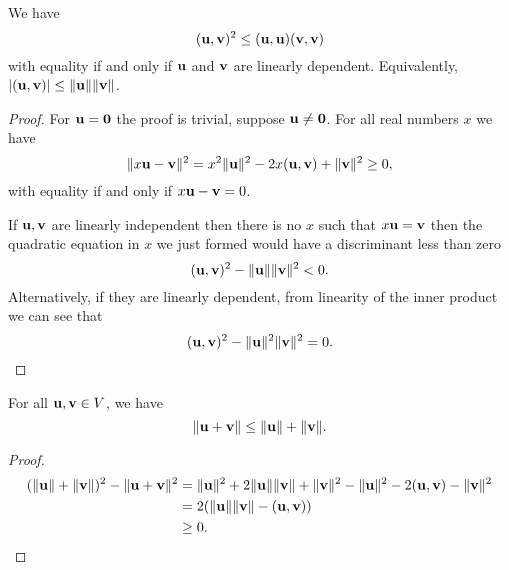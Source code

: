 \documentclass[10pt, a4paper]{article}
\begin{document}
\begin{theorem}\label{pre:linalg:thm:cauchyschwarz}
    We have
    \[
    (\mathbf{u}, \mathbf{v}) ^ 2 \leq (\mathbf{u}, \mathbf{u})(\mathbf{v}, \mathbf{v})
    \]
    with equality if and only if $\mathbf{u}$ and $\mathbf{v}$ are linearly dependent.
    Equivalently,
    $|(\mathbf{u}, \mathbf{v})| \leq \|\mathbf{u}\|\|\mathbf{v}\|$.

    \begin{proof}
        For $\mathbf{u} = \mathbf{0}$ the proof is trivial,
        suppose $\mathbf{u} \neq \mathbf{0}$.
        For all real numbers $x$ we have
        \[
        \|x\mathbf{u} - \mathbf{v}\| ^ 2 = x ^ 2\|\mathbf{u}\| ^ 2 - 2x(\mathbf{u}, \mathbf{v}) + \|\mathbf{v}\| ^ 2 \geq 0,
        \]
        with equality if and only if $x\mathbf{u} - \mathbf{v} = 0$.

        If $\mathbf{u}, \mathbf{v}$ are linearly independent then there is no $x$ such that $x\mathbf{u} = \mathbf{v}$ then the quadratic equation in $x$ we just formed would have a discriminant less than zero
        \[
        (\mathbf{u}, \mathbf{v}) ^ 2 - \|\mathbf{u}\|\|\mathbf{v}\| ^ 2 < 0.
        \]
        Alternatively,
        if they are linearly dependent,
        from linearity of the inner product we can see that
        \[
        (\mathbf{u}, \mathbf{v}) ^ 2 - \|\mathbf{u}\| ^ 2\|\mathbf{v}\| ^ 2 = 0.
        \]
    \end{proof}
\end{theorem}

\begin{corollary}
    For all $\mathbf{u}, \mathbf{v} \in V$,
    we have
    \[
    \|\mathbf{u} + \mathbf{v}\| \leq \|\mathbf{u}\| + \|\mathbf{v}\|.
    \]

    \begin{proof}
        \begin{align*}
            (\|\mathbf{u}\| + \|\mathbf{v}\|) ^ 2 - \|\mathbf{u} + \mathbf{v}\| ^ 2 &= \|\mathbf{u}\| ^ 2 + 2\|\mathbf{u}\|\|\mathbf{v}\| + \|\mathbf{v}\| ^ 2 - \|\mathbf{u}\| ^ 2 - 2(\mathbf{u}, \mathbf{v}) - \|\mathbf{v}\| ^ 2 \\
            &= 2(\|\mathbf{u}\|\|\mathbf{v}\| - (\mathbf{u}, \mathbf{v})) \\
            &\geq 0.
        \end{align*}
    \end{proof}
\end{corollary}
\end{document}
